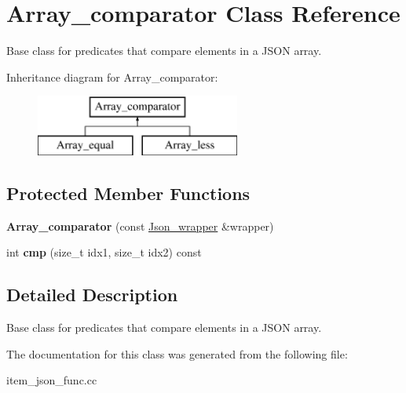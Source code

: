 \hypertarget{classArray__comparator}{}\section{Array\+\_\+comparator Class Reference}
\label{classArray__comparator}


Base class for predicates that compare elements in a J\+S\+ON array.  


Inheritance diagram for Array\+\_\+comparator\+:\begin{figure}[H]
\begin{center}
\leavevmode
\includegraphics[height=2.000000cm]{classArray__comparator}
\end{center}
\end{figure}
\subsection*{Protected Member Functions}
\begin{DoxyCompactItemize}
\item 
\mbox{\label{classArray__comparator_a7e9fcd02594406b9c2885e58bd2783f5}} 
{\bfseries Array\+\_\+comparator} (const \mbox{\hyperlink{classJson__wrapper}{Json\+\_\+wrapper}} \&wrapper)
\item 
\mbox{\label{classArray__comparator_adedad771fbb3bfb8a0a5dca4de830691}} 
int {\bfseries cmp} (size\+\_\+t idx1, size\+\_\+t idx2) const
\end{DoxyCompactItemize}


\subsection{Detailed Description}
Base class for predicates that compare elements in a J\+S\+ON array. 

The documentation for this class was generated from the following file\+:\begin{DoxyCompactItemize}
\item 
item\+\_\+json\+\_\+func.\+cc\end{DoxyCompactItemize}
